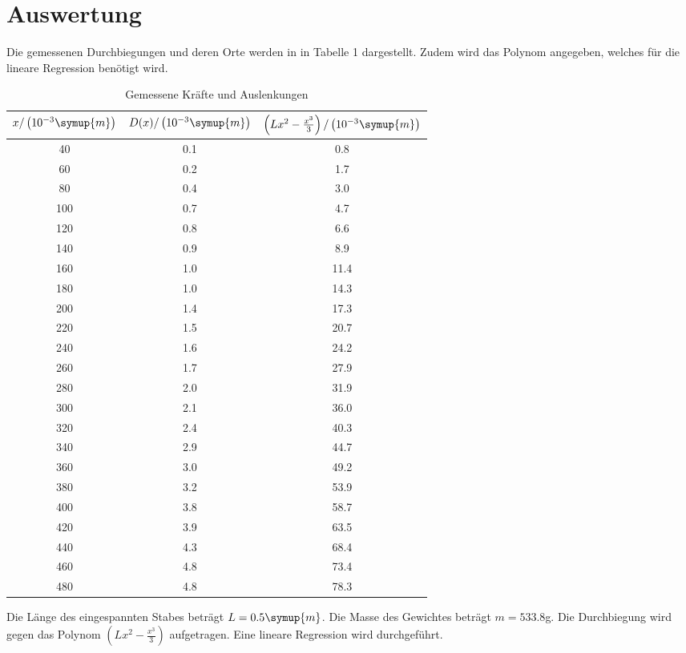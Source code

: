 \section{Auswertung}
\label{sec:Auswertung}
Die gemessenen Durchbiegungen und deren Orte werden in in Tabelle 1 dargestellt. Zudem wird
das Polynom angegeben, welches für die lineare Regression benötigt wird.

\begin{table}[H]
  \centering
  \caption{Gemessene Kräfte und Auslenkungen}
  \label{tab:Parameter}
  \begin{tabular}{c c c}
    \toprule
    $x/\left(10^{-3}\symup{m}\right)$ & $D(x)/\left(10^{-3}\symup{m}\right)$ & $\left(Lx^2 -\frac{x^3}{3}\right)/\left(10^{-3}\symup{m}\right)$\\
    \midrule
     40 & 0.1 &  0.8 \\
     60 & 0.2 &  1.7 \\
     80 & 0.4 &  3.0 \\
    100 & 0.7 &  4.7 \\
    120 & 0.8 &  6.6 \\
    140 & 0.9 &  8.9 \\
    160 & 1.0 & 11.4 \\
    180 & 1.0 & 14.3 \\
    200 & 1.4 & 17.3 \\
    220 & 1.5 & 20.7 \\
    240 & 1.6 & 24.2 \\
    260 & 1.7 & 27.9 \\
    280 & 2.0 & 31.9 \\
    300 & 2.1 & 36.0 \\
    320 & 2.4 & 40.3 \\
    340 & 2.9 & 44.7 \\
    360 & 3.0 & 49.2 \\
    380 & 3.2 & 53.9 \\
    400 & 3.8 & 58.7 \\
    420 & 3.9 & 63.5 \\
    440 & 4.3 & 68.4 \\
    460 & 4.8 & 73.4 \\
    480 & 4.8 & 78.3 \\
    \bottomrule
  \end{tabular}
\end{table}

Die Länge des eingespannten Stabes beträgt $L = 0.5 \symup{m}$. Die Masse des
Gewichtes beträgt $m = 533.8$g.
Die Durchbiegung wird gegen das Polynom $\left(Lx^2 -\frac{x^3}{3}\right)$ aufgetragen. Eine
lineare Regression wird durchgeführt.

